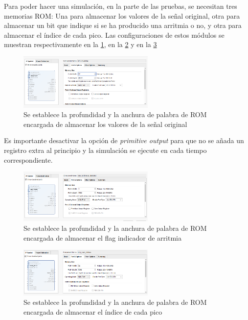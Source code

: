  Para poder hacer una simulación, en la parte de las pruebas, se necesitan tres memorias ROM: Una para almacenar los valores de la señal original, otra para almacenar un bit que indique si se ha producido una arritmia o no, y otra para almacenar el índice de cada pico. Las configuraciones de estos módulos se muestran respectivamente en la \cref{fig:inputromconf}, en la \cref{fig:romoutputarritmiasconf} y en la \cref{fig:romoutputpeakindicesconf}



\begin{figure}[h!]
    \centering
    \includegraphics[width=0.6\textwidth]{./Images/img_implementacion_hw/inputromconf.png}
    \caption{Se establece la profundidad y la anchura de palabra de ROM encargada de almacenar los valores de la señal original}
    \label{fig:inputromconf}
\end{figure}
 Es importante desactivar la opción de \textit{primitive output} para que no se añada un registro extra 
 al principio y la simulación se ejecute en cada tiempo correspondiente. 
\begin{figure}[h!]
    \centering
    \includegraphics[width=0.6\textwidth]{./Images/img_implementacion_hw/romoutputarritmiasconf.png}
    \caption{Se establece la profundidad y la anchura de palabra de ROM encargada de almacenar el flag indicador de arritmia}
    \label{fig:romoutputarritmiasconf}
\end{figure}

\begin{figure}[h!]
    \centering
    \includegraphics[width=0.6\textwidth]{./Images/img_implementacion_hw/romoutputpeakindicesconf.png}
    \caption{Se establece la profundidad y la anchura de palabra de ROM encargada de almacenar el índice de cada pico}
    \label{fig:romoutputpeakindicesconf}
\end{figure}

